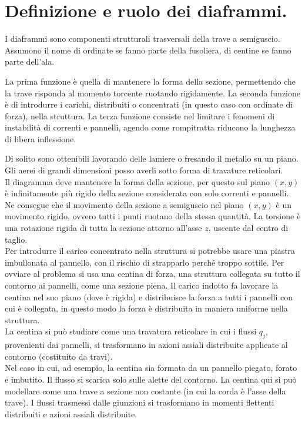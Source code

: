 \section{Definizione e ruolo dei diaframmi.}


\begin{definizioneBox}
    I diaframmi sono componenti strutturali trasversali della trave a semiguscio. Assumono il nome di ordinate se fanno parte della fusoliera, di centine se fanno parte dell'ala.
    
    La prima funzione è quella di mantenere la forma della sezione, permettendo che la trave risponda al momento torcente ruotando rigidamente. La seconda funzione è di introdurre i carichi, distribuiti o concentrati (in questo caso con ordinate di forza), nella struttura. La terza funzione consiste nel limitare i fenomeni di instabilità di correnti e pannelli, agendo come rompitratta riducono la lunghezza di libera inflessione.
\end{definizioneBox}

Di solito sono ottenibili lavorando delle lamiere o fresando il metallo su un piano. Gli aerei di grandi dimensioni posso averli sotto forma di travature reticolari.\\
Il diagramma deve mantenere la forma della sezione, per questo sul piano $(x,y)$ è infinitamente più rigido della sezione considerata con solo correnti e pannelli. Ne consegue che il movimento della sezione a semiguscio nel piano $(x,y)$ è un movimento rigido, ovvero tutti i punti ruotano della stessa quantità.
La torsione è una rotazione rigida di tutta la sezione attorno all'asse $z$, uscente dal centro di taglio.\\


Per introdurre il carico concentrato nella struttura si potrebbe usare una piastra imbullonata al pannello, con il rischio di strapparlo perché troppo sottile. Per ovviare al problema si usa una centina di forza, una struttura collegata su tutto il contorno ai pannelli, come una sezione piena. Il carico indotto fa lavorare la centina nel suo piano (dove è rigida) e distribuisce la forza a tutti i pannelli con cui è collegata, in questo modo la forza è distribuita in maniera uniforme nella struttura.\\


La centina si può studiare come una travatura reticolare in cui i flussi $q_j$, provenienti dai pannelli, si trasformano in azioni assiali distribuite applicate al contorno (costituito da travi).\\
Nel caso in cui, ad esempio, la centina sia formata da un pannello piegato, forato e imbutito. Il flusso si scarica solo sulle alette del contorno. La centina qui si può modellare come una trave a sezione non costante (in cui la corda è l'asse della trave). I flussi trasmessi dalle giunzioni si trasformano in momenti flettenti distribuiti e azioni assiali distribuite.






